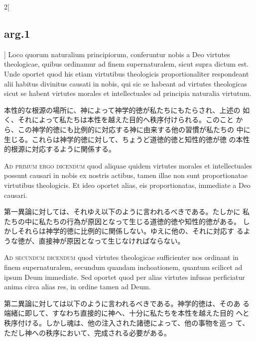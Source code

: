 \documentclass[paper=a4paper,fontsize=10pt,jafontsize=9pt,titlepage]{jlreq}
\begin{document}
\begin{paracol}{2}[\subsection{arg.1}]
Loco quorum naturalium principiorum, conferuntur nobis a
Deo virtutes theologicae, quibus ordinamur ad finem supernaturalem,
sicut supra dictum est. Unde oportet quod his etiam virtutibus
theologicis proportionaliter respondeant alii habitus divinitus
causati in nobis, qui sic se habeant ad virtutes theologicas sicut se
habent virtutes morales et intellectuales ad principia naturalia
virtutum.

\switchcolumn

本性的な根源の場所に、神によって神学的徳が私たちにもたらされ、上述の
 如く、それによって私たちは本性を越えた目的へ秩序付けられる。このこと
 から、この神学的徳にも比例的に対応する神に由来する他の習慣が私たちの
 中に生じる。これらは神学的徳に対して、ちょうど道徳的徳と知性的徳が徳
 の本性的根源に対応するように関係する。

\switchcolumn*[\subsection{ad.1}]

{\scshape Ad primum ergo dicendum} quod aliquae quidem virtutes
morales et intellectuales possunt causari in nobis ex nostris actibus,
tamen illae non sunt proportionatae virtutibus theologicis. Et ideo
oportet alias, eis proportionatas, immediate a Deo causari.

\switchcolumn

第一異論に対しては、それゆえ以下のように言われるべきである。たしかに
 私たちの中に私たちの行為が原因となって生じる道徳的徳や知性的徳がある。
 しかしそれらは神学的徳に比例的に関係しない。ゆえに他の、それに対応す
 るような徳が、直接神が原因となって生じなければならない。

\switchcolumn*[\subsection{ad.2}]

{\scshape Ad secundum dicendum} quod virtutes theologicae sufficienter
nos ordinant in finem supernaturalem, secundum quandam inchoationem,
quantum scilicet ad ipsum Deum immediate. Sed oportet quod per alias
virtutes infusas perficiatur anima circa alias res, in ordine tamen ad
Deum.

\switchcolumn

第二異論に対しては以下のように言われるべきである。神学的徳は、そのあ
 る端緒に即して、すなわち直接的に神へ、十分に私たちを本性を越えた目的
 へと秩序付ける。しかし魂は、他の注入された諸徳によって、他の事物を巡っ
 て、ただし神への秩序において、完成される必要がある。


\end{paracol}
\end{document}
